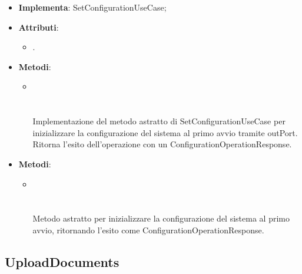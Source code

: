 \documentclass[10pt, a4paper]{article}
\begin{document}
\label{SetConfigurationServiceDettaglio}
\begin{itemize}
    \item \textbf{Implementa}: SetConfigurationUseCase;
    \item \textbf{Attributi}:
    \begin{itemize}
        \item {}.
    \end{itemize}
    \item \textbf{Metodi}:
    \begin{itemize}
        \item {}\\ \\ \\
        Implementazione del metodo astratto di SetConfigurationUseCase per inizializzare la configurazione del sistema al primo avvio tramite outPort. Ritorna l'esito dell'operazione con un ConfigurationOperationResponse.
    \end{itemize}
\end{itemize}



\label{SetConfigurationUseCaseDettaglio}
\begin{itemize}
    \item \textbf{Metodi}:
    \begin{itemize}
        \item {}\\ \\ \\
        Metodo astratto per inizializzare la configurazione del sistema al primo avvio, ritornando l'esito come ConfigurationOperationResponse.
    \end{itemize}
\end{itemize}







\subsection{UploadDocuments}
\end{document}
